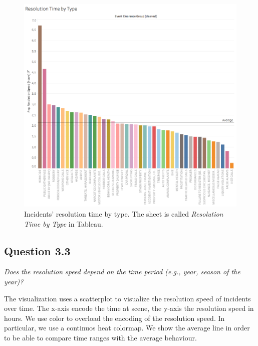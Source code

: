 \begin{figure}[h]
	\centering
	\includegraphics[width=\columnwidth]{figures/3_2_resolution_speed_by_type}
	\caption{Incidents' resolution time by type. The sheet is called \textit{Resolution Time by Type} in Tableau.}
	\label{fig:3_2_resolution_speed_by_type}
\end{figure}


\subsection*{Question 3.3}
\textit{Does the resolution speed depend on the time period (e.g., year, season of the year)?}

The visualization uses a scatterplot to visualize the resolution speed of incidents over time.
The x-axis encode the time at scene, the y-axis the resolution speed in hours.
We use color to overload the encoding of the resolution speed.
In particular, we use a continuos heat colormap.
We show the average line in order to be able to compare time ranges with the average behaviour.

